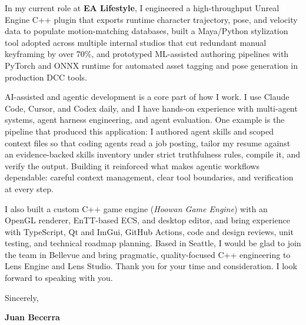 \documentclass[letterpaper,11pt]{article}
\begin{document}
In my current role at \textbf{EA Lifestyle}, I engineered a high-throughput Unreal Engine C++ plugin that 
exports runtime character trajectory, pose, and velocity data to populate motion-matching databases,
built a Maya/Python stylization tool adopted across multiple internal studios that cut redundant manual
keyframing by over 70\%, and prototyped ML-assisted authoring pipelines with PyTorch and ONNX runtime
for automated asset tagging and pose generation in production DCC tools.

AI-assisted and agentic development is a core part of how I work. I use Claude Code, Cursor, and Codex
daily, and I have hands-on experience with multi-agent systems, agent harness engineering, and agent
evaluation. One example is the pipeline that produced this application: I authored agent skills and
scoped context files so that coding agents read a job posting, tailor my resume against an
evidence-backed skills inventory under strict truthfulness rules, compile it, and verify the output.
Building it reinforced what makes agentic workflows dependable: careful context management, clear
tool boundaries, and verification at every step.

I also built a custom C++ game engine (\emph{Hoowan Game Engine}) with an OpenGL renderer, EnTT-based
ECS, and desktop editor, and bring experience with TypeScript, Qt and ImGui, GitHub Actions, code and
design reviews, unit testing, and technical roadmap planning. Based in Seattle, I would be glad to join
the team in Bellevue and bring pragmatic, quality-focused C++ engineering to Lens Engine and Lens Studio.
Thank you for your time and consideration. I look forward to speaking with you.

\vspace{10pt}
\noindent Sincerely,

\vspace{14pt}
\noindent \textbf{Juan Becerra}
\end{document}
